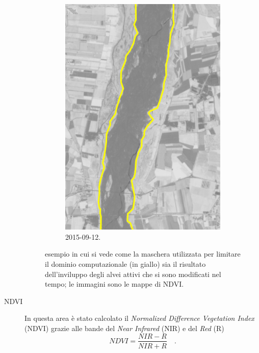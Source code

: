 \begin{description}
\begin{figure}[t]
\begin{subfigure}[b]{0.4\textwidth}
			\includegraphics[width=\textwidth]{files/esempio_mask_2015_09_12.jpeg}
			\caption{\Se{} 2015-09-12.}
		\end{subfigure}
		\caption[definizione della maschera per limitare il dominio computazionale]
			{esempio in cui si vede come la maschera utilizzata per limitare il dominio computazionale (in giallo) sia il risultato dell'inviluppo degli alvei attivi che si sono modificati nel tempo; le immagini sono le mappe di NDVI.}
		\label{fig:esempio-maschera}
	\end{figure}
	\item[NDVI] 
	In questa area è stato calcolato il \emph{Normalized Difference Vegetation Index} (NDVI) grazie alle bande del \emph{Near Infrared} (NIR) e del \emph{Red} (R)
	\begin{equation}
		NDVI = \frac{NIR - R}{NIR + R} \quad .

\end{equation}
\end{description}
